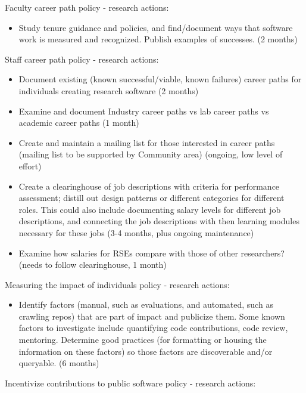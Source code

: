 \documentclass[
]{book}
\providecommand{\tightlist}{%
  \setlength{\itemsep}{0pt}\setlength{\parskip}{0pt}}
\begin{document}
Faculty career path policy - research actions:

\begin{itemize}
\tightlist
\item
  Study tenure guidance and policies, and find/document ways that software work is measured
  and recognized. Publish examples of successes. (2 months)
\end{itemize}

Staff career path policy - research actions:

\begin{itemize}
\item
  Document existing (known successful/viable, known failures) career paths for individuals
  creating research software (2 months)
\item
  Examine and document Industry career paths vs lab career paths vs academic career paths (1 month)
\item
  Create and maintain a mailing list for those interested in career paths (mailing list to be
  supported by Community area) (ongoing, low level of effort)
\item
  Create a clearinghouse of job descriptions with criteria for performance assessment; distill
  out design patterns or different categories for different roles. This could also include documenting
  salary levels for different job descriptions, and connecting the job descriptions with then learning
  modules necessary for these jobs (3-4 months, plus ongoing maintenance)
\item
  Examine how salaries for RSEs compare with those of other researchers? (needs to follow clearinghouse, 1 month)
\end{itemize}

Measuring the impact of individuals policy - research actions:

\begin{itemize}
\tightlist
\item
  Identify factors (manual, such as evaluations, and automated, such as crawling repos) that are
  part of impact and publicize them. Some known factors to investigate include quantifying code
  contributions, code review, mentoring. Determine good practices (for formatting or housing the
  information on these factors) so those factors are discoverable and/or queryable. (6 months)
\end{itemize}

Incentivize contributions to public software policy - research actions:
\end{document}
